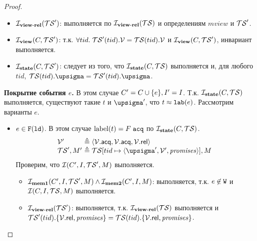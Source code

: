 \begin{proof}
\begin{itemize}
        \item $\mathcal{I}_{\rm \bf view\text{-}rel}(\mathcal{TS}')$: выполняется по $\mathcal{I}_{\rm \bf view\text{-}rel}(\mathcal{TS})$ и определениям $mview$ и $\mathcal{TS}'$.

        \item $\mathcal{I}_{\rm \bf view}(C, \mathcal{TS}')$: т.к. $\forall tid. \; \mathcal{TS}'(tid).\mathcal{V} = \mathcal{TS}(tid).\mathcal{V}$ и $\mathcal{I}_{\rm \bf view}(C, \mathcal{TS}')$,
          инвариант выполняется.

        \item $\mathcal{I}_{\rm \bf state}(C, \mathcal{TS}')$:
          следует из того, что $\mathcal{I}_{\rm \bf state}(C, \mathcal{TS})$ выполняется и, для любого $tid$, $\TSf(tid).\pstate = \TSf'(tid).\pstate$.
      \end{itemize}

  
  {\bf Покрытие события $e$.} В этом случае $C' = C \cup \{e\}, I' = I$.
      Т.к. $\mathcal{I}_{\rm \bf state}(C, \mathcal{TS})$ выполняется, существуют такие $t$ и $\pstate'$, что $t \approx {\mathtt{lab}}(e)$.
      Рассмотрим варианты $e$.
      \begin{itemize}
        \item $e \in {{\mathtt{F}}}(\mathtt{ld})$.
          В этом случае ${\rm label}(t) = F \; {\mathtt{acq}}$ по $\mathcal{I}_{\rm \bf state}(C, \mathcal{TS})$.
          \[\begin{array}{l@{~}l}
            \View'    & \defeq \tup{\View.\viewAcq, \View.\viewAcq, \View.\viewRel} \\
            \TSf', M' & \defeq \TSf[tid \mapsto \tup{\pstate', \View', \PromSet}], M \\
          \end{array}\]
      Проверим, что $\mathcal{I}(C', I, \mathcal{TS}', M)$ выполняется.
      \begin{itemize}
        \item $\mathcal{I}_{\rm \bf mem1}(C', I, \mathcal{TS}', M) \land \mathcal{I}_{\rm \bf mem2}(C', I, M)$:
          выполняется, т.к. $e \not\in {\mathtt{W}}$ и $\mathcal{I}(C, I, \mathcal{TS}, M)$ выполняется.

        \item $\mathcal{I}_{\rm \bf view\text{-}rel}(\mathcal{TS}')$: выполняется, т.к. $\mathcal{I}_{\rm \bf view\text{-}rel}(\mathcal{TS})$ выполняется и\\
          $\mathcal{TS}'(tid).\{\mathcal{V}.{\sf rel}, \mathit{promises}\} = \mathcal{TS}(tid).\{\mathcal{V}.{\sf rel}, \mathit{promises}\}$.


\end{itemize}
\end{itemize}
\end{proof}
